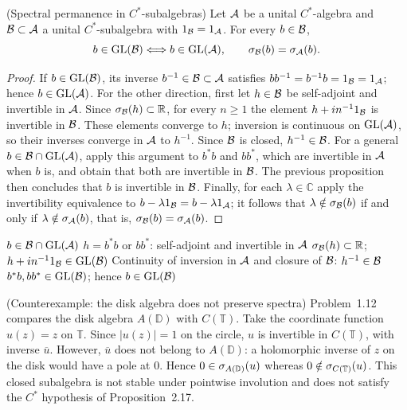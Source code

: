 \begin{cthproposicion}{(Spectral permanence in $C^*$-subalgebras)}
Let $\mathcal A$ be a unital $C^*$-algebra and $\mathcal B\subset\mathcal A$ a unital $C^*$-subalgebra
with $1_\mathcal B=1_\mathcal A$. For every $b\in\mathcal B$,
\[
 b\in\operatorname{GL}(\mathcal B)\Longleftrightarrow b\in\operatorname{GL}(\mathcal A),
 \qquad
 \sigma_\mathcal B(b)=\sigma_\mathcal A(b).
\]
\end{cthproposicion}

\begin{proof}[Proof]
If $b\in\operatorname{GL}(\mathcal B)$, its inverse $b^{-1}\in\mathcal B\subset\mathcal A$ satisfies
$bb^{-1}=b^{-1}b=1_\mathcal B=1_\mathcal A$; hence $b\in\operatorname{GL}(\mathcal A)$.
For the other direction, first let $h\in\mathcal B$ be self-adjoint and invertible
in $\mathcal A$. Since $\sigma_\mathcal B(h)\subset\mathbb R$, for every $n\ge1$ the element
$h+i n^{-1}1_\mathcal B$ is invertible in $\mathcal B$. These elements converge to $h$;
inversion is continuous on $\operatorname{GL}(\mathcal A)$, so their inverses converge in $\mathcal A$
to $h^{-1}$. Since $\mathcal B$ is closed, $h^{-1}\in\mathcal B$.
For a general $b\in\mathcal B\cap\operatorname{GL}(\mathcal A)$, apply this argument to $b^*b$ and $bb^*$,
which are invertible in $\mathcal A$ when $b$ is, and obtain that both are invertible
in $\mathcal B$. The previous proposition then concludes that $b$ is invertible in
$\mathcal B$. Finally, for each $\lambda\in\mathbb C$ apply the invertibility
equivalence to $b-\lambda1_\mathcal B=b-\lambda1_\mathcal A$; it follows that
$\lambda\notin\sigma_\mathcal B(b)$ if and only if
$\lambda\notin\sigma_\mathcal A(b)$, that is,
$\sigma_\mathcal B(b)=\sigma_\mathcal A(b)$.
\end{proof}

\proofdiagrambranch
{$b\in\mathcal B\cap\operatorname{GL}(\mathcal A)$}
{$h=b^*b$ or $bb^*$: self-adjoint and invertible in $\mathcal A$}
{$\sigma_\mathcal B(h)\subset\mathbb R$; $h+i n^{-1}1_\mathcal B\in\operatorname{GL}(\mathcal B)$}
{Continuity of inversion in $\mathcal A$ and closure of $\mathcal B$: $h^{-1}\in\mathcal B$}
{$b^*b,bb^*\in\operatorname{GL}(\mathcal B)$; hence $b\in\operatorname{GL}(\mathcal B)$}

\begin{cthejemplo}{(Counterexample: the disk algebra does not preserve spectra)}
Problem~1.12 compares the disk algebra $A(\mathbb D)$ with $C(\mathbb T)$.
Take the coordinate function $u(z)=z$ on $\mathbb T$. Since
$|u(z)|=1$ on the circle, $u$ is invertible in $C(\mathbb T)$,
with inverse $\overline u$. However, $\overline u$ does not belong to
$A(\mathbb D)$: a holomorphic inverse of $z$ on the disk would have a pole
at $0$. Hence $0\in\sigma_{A(\mathbb D)}(u)$ whereas
$0\notin\sigma_{C(\mathbb T)}(u)$.
This closed subalgebra is not stable under pointwise involution and does not
satisfy the $C^*$ hypothesis of Proposition~2.17.
\end{cthejemplo}

